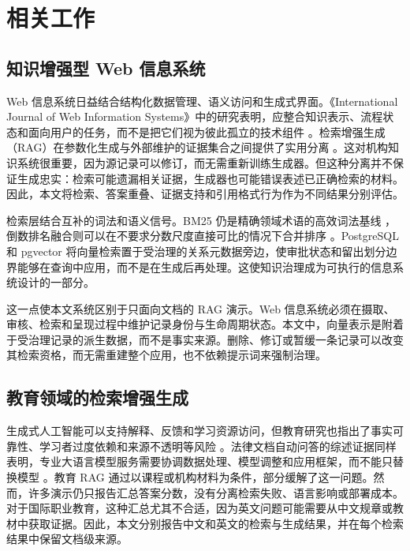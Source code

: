 \section{相关工作}

\subsection{知识增强型 Web 信息系统}

Web 信息系统日益结合结构化数据管理、语义访问和生成式界面。《International Journal of Web Information Systems》中的研究表明，应整合知识表示、流程状态和面向用户的任务，而不是把它们视为彼此孤立的技术组件 \citep{hubscher2021knowledge}。检索增强生成（RAG）在参数化生成与外部维护的证据集合之间提供了实用分离 \citep{lewis2020rag}。这对机构知识系统很重要，因为源记录可以修订，而无需重新训练生成器。但这种分离并不保证生成忠实：检索可能遗漏相关证据，生成器也可能错误表述已正确检索的材料。因此，本文将检索、答案重叠、证据支持和引用格式行为作为不同结果分别评估。

检索层结合互补的词法和语义信号。BM25 仍是精确领域术语的高效词法基线 \citep{robertson2009bm25}，倒数排名融合则可以在不要求分数尺度直接可比的情况下合并排序 \citep{cormack2009rrf}。PostgreSQL 和 pgvector 将向量检索置于受治理的关系元数据旁边，使审批状态和留出划分边界能够在查询中应用，而不是在生成后再处理。这使知识治理成为可执行的信息系统设计的一部分。

这一点使本文系统区别于只面向文档的 RAG 演示。Web 信息系统必须在摄取、审核、检索和呈现过程中维护记录身份与生命周期状态。本文中，向量表示是附着于受治理记录的派生数据，而不是事实来源。删除、修订或暂缓一条记录可以改变其检索资格，而无需重建整个应用，也不依赖提示词来强制治理。

\subsection{教育领域的检索增强生成}

生成式人工智能可以支持解释、反馈和学习资源访问，但教育研究也指出了事实可靠性、学习者过度依赖和来源不透明等风险 \citep{kasneci2023chatgpt,unesco2023guidance}。法律文档自动问答的综述证据同样表明，专业大语言模型服务需要协调数据处理、模型调整和应用框架，而不能只替换模型 \citep{yang2024legalqa}。教育 RAG 通过以课程或机构材料为条件，部分缓解了这一问题。然而，许多演示仍只报告汇总答案分数，没有分离检索失败、语言影响或部署成本。对于国际职业教育，这种汇总尤其不合适，因为英文问题可能需要从中文规章或教材中获取证据。因此，本文分别报告中文和英文的检索与生成结果，并在每个检索结果中保留文档级来源。

